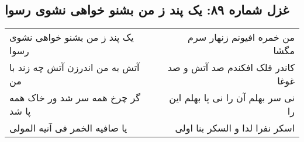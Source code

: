 \begin{center}
\section*{غزل شماره ۸۹: یک پند ز من بشنو خواهی نشوی رسوا}
\label{sec:0089}
\begin{longtable}{l p{0.5cm} r}
یک پند ز من بشنو خواهی نشوی رسوا
&&
من خمره افیونم زنهار سرم مگشا
\\
آتش به من اندرزن آتش چه زند با من
&&
کاندر فلک افکندم صد آتش و صد غوغا
\\
گر چرخ همه سر شد ور خاک همه پا شد
&&
نی سر بهلم آن را نی پا بهلم این را
\\
یا صافیه الخمر فی آنیه المولی
&&
اسکر نفرا لدا و السکر بنا اولی
\\
\end{longtable}
\end{center}
